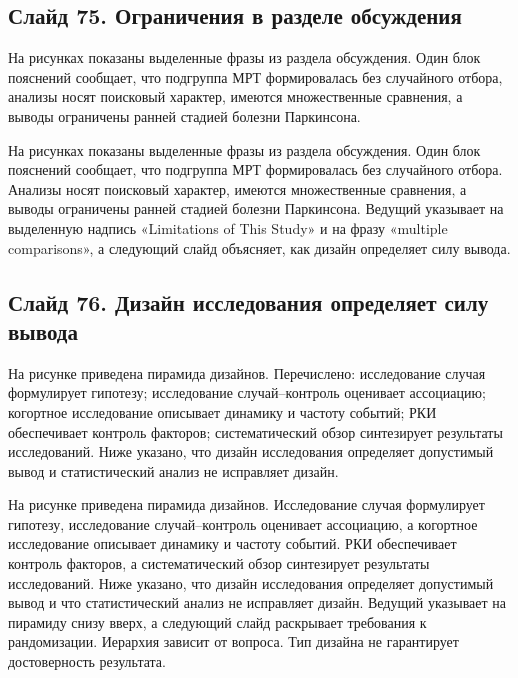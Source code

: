 \documentclass[11pt,a4paper]{article}
\begin{document}
\subsection*{Слайд 75. Ограничения в разделе обсуждения}
\begin{onslide}
На рисунках показаны выделенные фразы из раздела обсуждения. Один блок пояснений сообщает, что подгруппа МРТ формировалась без случайного отбора, анализы носят поисковый характер, имеются множественные сравнения, а выводы ограничены ранней стадией болезни Паркинсона.
\end{onslide}
На рисунках показаны выделенные фразы из раздела обсуждения. Один блок пояснений сообщает, что подгруппа МРТ формировалась без случайного отбора. Анализы носят поисковый характер, имеются множественные сравнения, а выводы ограничены ранней стадией болезни Паркинсона. Ведущий указывает на выделенную надпись «Limitations of This Study» и на фразу «multiple comparisons», а следующий слайд объясняет, как дизайн определяет силу вывода.

\subsection*{Слайд 76. Дизайн исследования определяет силу вывода}
\begin{onslide}
На рисунке приведена пирамида дизайнов. Перечислено: исследование случая формулирует гипотезу; исследование случай--контроль оценивает ассоциацию; когортное исследование описывает динамику и частоту событий; РКИ обеспечивает контроль факторов; систематический обзор синтезирует результаты исследований. Ниже указано, что дизайн исследования определяет допустимый вывод и статистический анализ не исправляет дизайн.
\end{onslide}
На рисунке приведена пирамида дизайнов. Исследование случая формулирует гипотезу, исследование случай--контроль оценивает ассоциацию, а когортное исследование описывает динамику и частоту событий. РКИ обеспечивает контроль факторов, а систематический обзор синтезирует результаты исследований. Ниже указано, что дизайн исследования определяет допустимый вывод и что статистический анализ не исправляет дизайн. Ведущий указывает на пирамиду снизу вверх, а следующий слайд раскрывает требования к рандомизации.
Иерархия зависит от вопроса. Тип дизайна не гарантирует достоверность результата.
\end{document}
